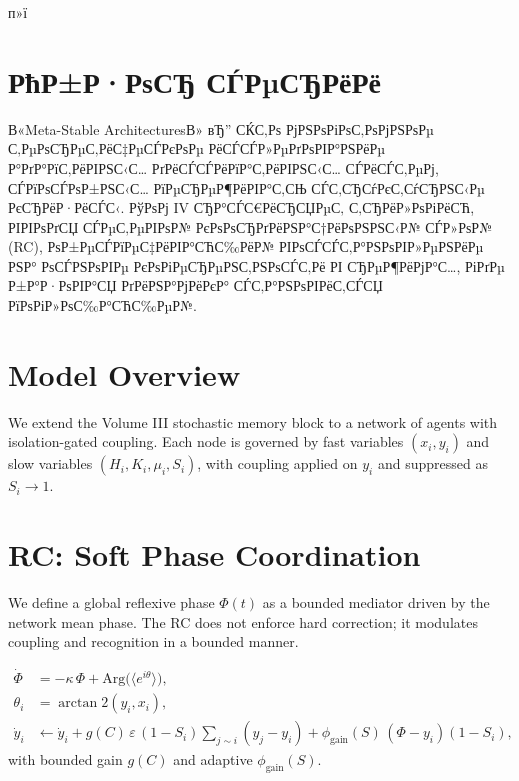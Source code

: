 ﻿п»ї\documentclass[12pt,a4paper]{article}
\begin{document}
\section*{РћР±Р·РѕСЂ СЃРµСЂРёРё}
В«Meta-Stable ArchitecturesВ» вЂ” СЌС‚Рѕ РјРЅРѕРіРѕС‚РѕРјРЅРѕРµ С‚РµРѕСЂРµС‚РёС‡РµСЃРєРѕРµ РёСЃСЃР»РµРґРѕРІР°РЅРёРµ Р°РґР°РїС‚РёРІРЅС‹С… РґРёСЃСЃРёРїР°С‚РёРІРЅС‹С… СЃРёСЃС‚РµРј, СЃРїРѕСЃРѕР±РЅС‹С… РїРµСЂРµР¶РёРІР°С‚СЊ СЃС‚СЂСѓРєС‚СѓСЂРЅС‹Рµ РєСЂРёР·РёСЃС‹. РўРѕРј IV СЂР°СЃС€РёСЂСЏРµС‚ С‚СЂРёР»РѕРіРёСЋ, РІРІРѕРґСЏ СЃРµС‚РµРІРѕР№ РєРѕРѕСЂРґРёРЅР°С†РёРѕРЅРЅС‹Р№ СЃР»РѕР№ (RC), РѕР±РµСЃРїРµС‡РёРІР°СЋС‰РёР№ РІРѕСЃСЃС‚Р°РЅРѕРІР»РµРЅРёРµ РЅР° РѕСЃРЅРѕРІРµ РєРѕРіРµСЂРµРЅС‚РЅРѕСЃС‚Рё РІ СЂРµР¶РёРјР°С…, РіРґРµ Р±Р°Р·РѕРІР°СЏ РґРёРЅР°РјРёРєР° СЃС‚Р°РЅРѕРІРёС‚СЃСЏ РїРѕРіР»РѕС‰Р°СЋС‰РµР№.

\section{Model Overview}
We extend the Volume III stochastic memory block to a network of agents with isolation-gated coupling. Each node is governed by fast variables $(x_i,y_i)$ and slow variables $(H_i,K_i,\mu_i,S_i)$, with coupling applied on $y_i$ and suppressed as $S_i\to 1$.

\section{RC: Soft Phase Coordination}
We define a global reflexive phase $\Phi(t)$ as a bounded mediator driven by the network mean phase. The RC does not enforce hard correction; it modulates coupling and recognition in a bounded manner.

\begin{align}
\dot{\Phi} &= -\kappa\,\Phi + \mathrm{Arg}\big(\langle e^{i\theta}\rangle\big), \\
\theta_i &= \arctan2(y_i, x_i), \\
\dot{y}_i &\leftarrow \dot{y}_i + g(C)\,\varepsilon\,(1-S_i)\sum_{j\sim i}(y_j-y_i) + \phi_{\mathrm{gain}}(S)\,(\Phi - y_i)(1-S_i),
\end{align}
with bounded gain $g(C)$ and adaptive $\phi_{\mathrm{gain}}(S)$.
\end{document}
